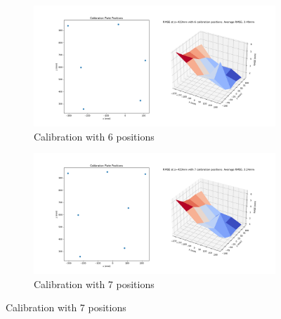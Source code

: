 \begin{figure}
    \begin{subfigure}[b]{.45\linewidth}
        \includegraphics[width=\linewidth]{bilder/project/calibration_result_figures/calibration_accuracy_423mm_iter6.png}
        \caption{Calibration with 6 positions}\label{fig:423mm_iter6}
    \end{subfigure}
    \begin{subfigure}[b]{.45\linewidth}
        \includegraphics[width=\linewidth]{bilder/project/calibration_result_figures/calibration_accuracy_423mm_iter7.png}
        \caption{Calibration with 7 positions}\label{fig:423mm_iter7}
    \end{subfigure}



\end{figure}
